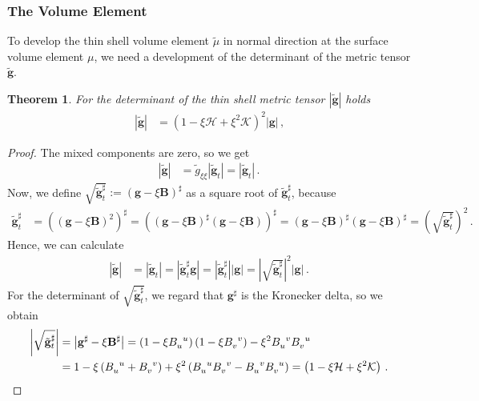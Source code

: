 \documentclass[a4paper,11pt]{scrartcl}
\newcommand{\gb}{\mathbf{g}}
\newcommand{\tgb}{\tilde{\gb}}
\newcommand{\tg}{\tilde{g}}
\newcommand{\Bb}{\mathbf{B}}
\newcommand{\meanc}{\mathcal{H}}
\newcommand{\gaussc}{\mathcal{K}}
\newcommand{\formComma}{\,\text{,}}
\newcommand{\formPeriod}{\,\text{.}}
\newtheorem{theorem}{Theorem}
\begin{document}
\subsubsection{The Volume Element}
  To develop the thin shell volume element \( \tilde{\mu} \) in normal direction at the surface volume element \( \mu \), 
  we need a development of the determinant of the metric tensor \( \tgb \).
  \begin{theorem}
    For the determinant of the thin shell metric tensor \( \left| \tgb \right| \) holds
    \begin{align}
       \left| \tgb \right| &= \left( 1 - \xi\meanc + \xi^{2}\gaussc \right)^{2}\left| \gb \right|\formComma
    \end{align}
  \end{theorem}
  \begin{proof}
    The mixed components are zero, so we get
    \begin{align}
      \left| \tgb \right| &= \tg_{\xi\xi}\left| \tgb_{t} \right| = \left| \tgb_{t} \right|\formPeriod
    \end{align}
    Now, we define \( \sqrt{\tgb_{t}^{\sharp}}   := \left(\gb - \xi \Bb\right)^{\sharp} \) as a square root of \( \tgb_{t}^{\sharp} \),
    because
    \begin{align}
      \tgb_{t}^{\sharp} &= \left( \left( \gb -\xi\Bb \right)^{2} \right)^{\sharp}
              = \left( \left( \gb -\xi\Bb \right)^{\sharp}\left( \gb -\xi\Bb \right)  \right)^{\sharp}
              = \left( \gb -\xi\Bb \right)^{\sharp}\left( \gb -\xi\Bb \right)^{\sharp} 
              = \left( \sqrt{\tgb_{t}^{\sharp}} \right)^{2} \formPeriod
    \end{align}
    Hence, we can calculate
    \begin{align}
      \left| \tgb \right| &= \left| \tgb_{t} \right| = \left| \tgb_{t}^{\sharp}\gb \right|
                    =\left| \tgb_{t}^{\sharp} \right| \left| \gb \right|
                    =\left| \sqrt{\tgb_{t}^{\sharp}} \right|^{2} \left| \gb \right| \formPeriod
    \end{align}
    For the determinant of \( \sqrt{\tgb_{t}^{\sharp}} \), we regard that \( \gb^{\sharp} \) is the Kronecker delta,
    so we obtain
    \begin{align}
       \left| \sqrt{\tgb_{t}^{\sharp}} \right| 
            &= \left| \gb^{\sharp} - \xi\Bb^{\sharp} \right|
             = \left( 1 - \xi\tensor{B}{_{u}^{u}} \right)\left( 1 - \xi\tensor{B}{_{v}^{v}} \right)
                  - \xi^{2}\tensor{B}{_{u}^{v}}\tensor{B}{_{v}^{u}} \\
            &= 1 - \xi\left( \tensor{B}{_{u}^{u}} + \tensor{B}{_{v}^{v}} \right) 
                  + \xi^{2}\left( \tensor{B}{_{u}^{u}} \tensor{B}{_{v}^{v}} - \tensor{B}{_{u}^{v}}\tensor{B}{_{v}^{u}} \right)
             =\left( 1 - \xi\meanc + \xi^{2}\gaussc \right) \formPeriod
    \end{align}
  \end{proof}
\end{document}
